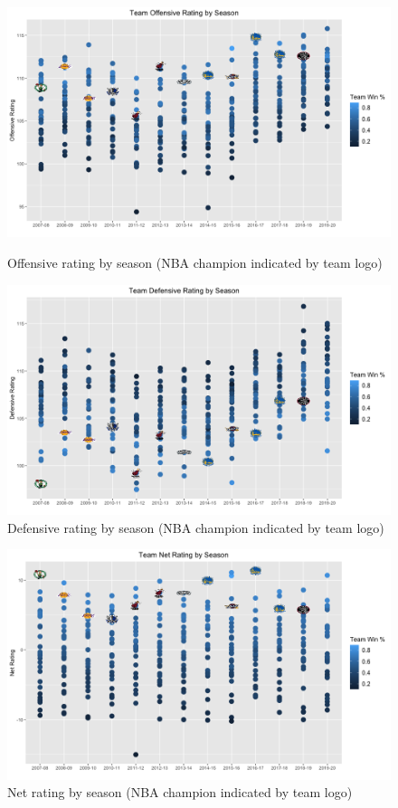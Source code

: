 \documentclass [MS] {uclathes}
\begin{document}
\begin{figure}[p]
\centering
  \includegraphics[width=450px]{off_rtg.png}
  \caption{Offensive rating by season (NBA champion indicated by team logo)}
  \label{fig:ortg}
  
\vspace{1cm}
  
\centering
  \includegraphics[width=450px]{def_rtg.png}
  \caption{Defensive rating by season (NBA champion indicated by team logo)}
  \label{fig:drtg}
\end{figure}

\begin{figure}[h]
\centering
  \includegraphics[width=450px]{net_rtg.png}
  \caption{Net rating by season (NBA champion indicated by team logo)}
  \label{fig:nrtg}
\end{figure}
\end{document}
